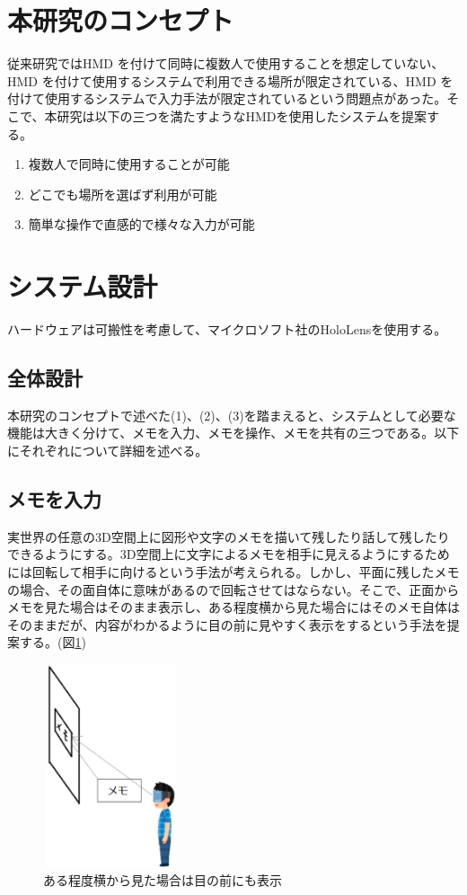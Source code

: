 \documentclass[twocolumn, a4paper]{UECIEresume}
\begin{document}
\section{本研究のコンセプト}
従来研究ではHMD を付けて同時に複数人で使用することを想定していない、HMD を付けて使用するシステムで利用できる場所が限定されている、HMD を付けて使用するシステムで入力手法が限定されているという問題点があった。そこで、本研究は以下の三つを満たすようなHMDを使用したシステムを提案する。
\begin{enumerate}[(1)]
 \item 複数人で同時に使用することが可能
 \item どこでも場所を選ばず利用が可能
 \item 簡単な操作で直感的で様々な入力が可能
\end{enumerate}

\section{システム設計}
ハードウェアは可搬性を考慮して、マイクロソフト社のHoloLens\cite{hololens}を使用する。

\subsection{全体設計}
本研究のコンセプトで述べた(1)、(2)、(3)を踏まえると、システムとして必要な機能は大きく分けて、メモを入力、メモを操作、メモを共有の三つである。以下にそれぞれについて詳細を述べる。

\subsection{メモを入力}
実世界の任意の3D空間上に図形や文字のメモを描いて残したり話して残したりできるようにする。3D空間上に文字によるメモを相手に見えるようにするためには回転して相手に向けるという手法が考えられる。しかし、平面に残したメモの場合、その面自体に意味があるので回転させてはならない。そこで、正面からメモを見た場合はそのまま表示し、ある程度横から見た場合にはそのメモ自体はそのままだが、内容がわかるように目の前に見やすく表示をするという手法を提案する。(図\ref{fig:memo_wall})

\begin{figure}[h]
  \begin{center}
    \includegraphics[clip,height=6.0cm,width=4.0cm]{./memo_wall.eps}
    \caption{ある程度横から見た場合は目の前にも表示}
    \label{fig:memo_wall}
  \end{center}
\end{figure}
\end{document}
